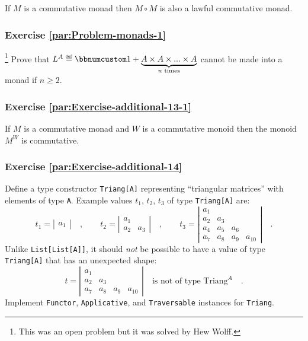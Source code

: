 If $M$ is a commutative monad then $M\circ M$ is also a lawful commutative
monad.

\subsubsection{Exercise \label{par:Problem-monads-1}\ref{par:Problem-monads-1}}

\footnote{This was an open problem but it was solved by Hew Wolff.}
Prove that $L^{A}\triangleq\bbnum 1+\underbrace{A\times A\times...\times A}_{n\text{ times}}$
cannot be made into a monad if $n\ge2$.

\subsubsection{Exercise \label{par:Exercise-additional-13-1}\ref{par:Exercise-additional-13-1}}

If $M$ is a commutative monad and $W$ is a commutative monoid then
the monoid $M^{W}$ is commutative.

\subsubsection{Exercise \label{par:Exercise-additional-14}\ref{par:Exercise-additional-14}}

Define a type constructor \lstinline!Triang[A]! representing \textsf{``}triangular
matrices\textsf{''} with elements of type \lstinline!A!. Example values $t_{1}$,
$t_{2}$, $t_{3}$ of type \lstinline!Triang[A]! are:
\[
t_{1}=\left|\begin{array}{c}
a_{1}\end{array}\right|\quad,\quad\quad t_{2}=\left|\begin{array}{cc}
a_{1}\\
a_{2} & a_{3}
\end{array}\right|\quad,\quad\quad t_{3}=\left|\begin{array}{cccc}
a_{1}\\
a_{2} & a_{3}\\
a_{4} & a_{5} & a_{6}\\
a_{7} & a_{8} & a_{9} & a_{10}
\end{array}\right|\quad.
\]
Unlike \lstinline!List[List[A]]!, it should \emph{not} be possible
to have a value of type \lstinline!Triang[A]! that has an unexpected
shape:
\[
t=\left|\begin{array}{cccc}
a_{1}\\
a_{2} & a_{3}\\
a_{7} & a_{8} & a_{9} & a_{10}
\end{array}\right|\quad\text{is not of type }\text{Triang}^{A}\quad.
\]
 Implement \lstinline!Functor!, \lstinline!Applicative!, and \lstinline!Traversable!
instances for \lstinline!Triang!.

